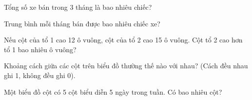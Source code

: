 \begin{ex}
Tổng số xe bán trong 3 tháng là bao nhiêu chiếc?
\end{ex}

\begin{ex}
Trung bình mỗi tháng bán được bao nhiêu chiếc xe?
\end{ex}

\begin{ex}
Nếu cột của tổ 1 cao 12 ô vuông, cột của tổ 2 cao 15 ô vuông. Cột tổ 2 cao hơn tổ 1 bao nhiêu ô vuông?
\end{ex}

\begin{ex}
Khoảng cách giữa các cột trên biểu đồ thường thế nào với nhau? (Cách đều nhau ghi 1, không đều ghi 0).
\end{ex}

\begin{ex}
Một biểu đồ cột có 5 cột biểu diễn 5 ngày trong tuần. Có bao nhiêu cột?
\end{ex}
